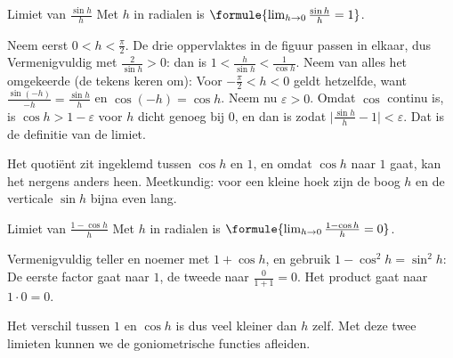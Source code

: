 \begin{theorie}
\begin{stelling}{Limiet van \texorpdfstring{$\frac{\sin h}{h}$}{sin h/h}}
Met $h$ in radialen is \quad $\formule{\lim_{h \to 0} \frac{\sin h}{h} = 1}$.
\end{stelling}
\begin{bewijs}
Neem eerst $0 < h < \frac{\pi}{2}$. De drie oppervlaktes in de figuur passen in elkaar, dus
Vermenigvuldig met $\frac{2}{\sin h} > 0$: dan is $1 < \frac{h}{\sin h} < \frac{1}{\cos h}$. Neem van alles het omgekeerde (de tekens keren om):
Voor $-\frac{\pi}{2} < h < 0$ geldt hetzelfde, want $\frac{\sin(-h)}{-h} = \frac{\sin h}{h}$ en $\cos(-h) = \cos h$. Neem nu $\varepsilon > 0$. Omdat $\cos$ continu is, is $\cos h > 1 - \varepsilon$ voor $h$ dicht genoeg bij $0$, en dan is
zodat $\bigl|\frac{\sin h}{h} - 1\bigr| < \varepsilon$. Dat is de definitie van de limiet.
\end{bewijs}
\end{theorie}

Het quotiënt zit ingeklemd tussen $\cos h$ en $1$, en omdat $\cos h$ naar $1$ gaat, kan het nergens anders heen. Meetkundig: voor een kleine hoek zijn de boog $h$ en de verticale $\sin h$ bijna even lang.

\begin{theorie}
\begin{stelling}{Limiet van \texorpdfstring{$\frac{1 - \cos h}{h}$}{(1 - cos h)/h}}
Met $h$ in radialen is \quad $\formule{\lim_{h \to 0} \frac{1 - \cos h}{h} = 0}$.
\end{stelling}
\begin{bewijs}
Vermenigvuldig teller en noemer met $1 + \cos h$, en gebruik $1 - \cos^2 h = \sin^2 h$:
De eerste factor gaat naar $1$, de tweede naar $\frac{0}{1 + 1} = 0$. Het product gaat naar $1 \cdot 0 = 0$.
\end{bewijs}
\end{theorie}

Het verschil tussen $1$ en $\cos h$ is dus veel kleiner dan $h$ zelf. Met deze twee limieten kunnen we de goniometrische functies afleiden.


